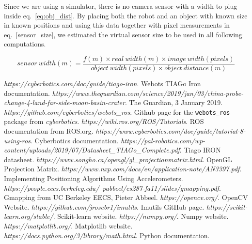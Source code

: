 \documentclass[a4paper]{article}
\begin{document}
	Since we are using a simulator, there is no camera sensor with a width to
	plug inside eq.~\ref{eq:obj_dist}. By placing both the robot and an object
	with known size in known positions and using this data together with pixel
	measurements in eq.~\ref{sensor_size}, we estimated the virtual sensor size
	to be used in all following computations.

	\begin{equation}\label{sensor_size}
		sensor~width(m) = 
		\frac{f(m) \times real~width(m) \times image~width(pixels)}
			{object~width(pixels) \times object~distance(m)}
	\end{equation}

	\newpage
	
	\begin{thebibliography}{19}
		\textit{https://cyberbotics.com/doc/guide/tiago-iron}. \newline
		Webots TIAGo Iron documentation.
		\textit{https://www.theguardian.com/science/2019/jan/03/china-probe-change-4-land-far-side-moon-basin-crater}. \newline
		The Guardian, 3 January 2019.
		\textit{https://github.com/cyberbotics/webots\_ros}. \newline
		Github page for the \texttt{webots\_ros} package from \textit{cyberbotics}.
		\textit{https://wiki.ros.org/ROS/Tutorials}. \newline
		ROS documentation from ROS.org.
		\textit{https://www.cyberbotics.com/doc/guide/tutorial-8-using-ros}. \newline
		Cyberbotics documentation.
		\textit{https://pal-robotics.com/wp-content/uploads/2019/07/Datasheet\_TIAGo\_Complete.pdf}. \newline
		Tiago IRON datasheet.
		\textit{https://www.songho.ca/opengl/gl\_projectionmatrix.html}. \newline
		OpenGL Projection Matrix.
		\textit{https://www.nxp.com/docs/en/application-note/AN3397.pdf}. \newline
		Implementing Positioning Algorithms Using Accelerometers.
		\textit{https://people.eecs.berkeley.edu/~pabbeel/cs287-fa11/slides/gmapping.pdf}. \newline
		Gmapping from UC Berkeley EECS, Pieter Abbeel.
		\textit{https://opencv.org/}. \newline
		OpenCV Website.
		\textit{https://github.com/jrosebr1/imutils}. \newline
		Imutils GitHub page.
		\textit{https://scikit-learn.org/stable/}. \newline
		Scikit-learn website.
		\textit{https://numpy.org/}. \newline
		Numpy website.
		\textit{https://matplotlib.org/}. \newline
		Matplotlib website.
		\textit{https://docs.python.org/3/library/math.html}. \newline
		Python documentation.
	\end{thebibliography}
\end{document}
